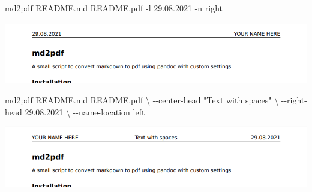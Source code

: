 \documentclass[
]{article}
\newenvironment{Shaded}{}{}
\newcommand{\AttributeTok}[1]{\textcolor[rgb]{0.49,0.56,0.16}{#1}}
\newcommand{\DataTypeTok}[1]{\textcolor[rgb]{0.56,0.13,0.00}{#1}}
\newcommand{\ExtensionTok}[1]{#1}
\newcommand{\NormalTok}[1]{#1}
\newcommand{\StringTok}[1]{\textcolor[rgb]{0.25,0.44,0.63}{#1}}
\begin{document}
\begin{Shaded}
\begin{Highlighting}[]
\ExtensionTok{md2pdf}\NormalTok{ README.md README.pdf }\AttributeTok{{-}l}\NormalTok{ 29.08.2021 }\AttributeTok{{-}n}\NormalTok{ right}
\end{Highlighting}
\end{Shaded}

\includegraphics{Images/Example3.png}

\begin{Shaded}
\begin{Highlighting}[]
\ExtensionTok{md2pdf}\NormalTok{ README.md README.pdf }\DataTypeTok{\textbackslash{}}
    \AttributeTok{{-}{-}center{-}head} \StringTok{"Text with spaces"} \DataTypeTok{\textbackslash{}}
    \AttributeTok{{-}{-}right{-}head}\NormalTok{ 29.08.2021 }\DataTypeTok{\textbackslash{}}
    \AttributeTok{{-}{-}name{-}location}\NormalTok{ left}
\end{Highlighting}
\end{Shaded}

\includegraphics{Images/Example4.png}
\end{document}
